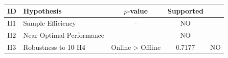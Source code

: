 \begin{tabular}{llcc}
\toprule
ID & Hypothesis & $p$-value & Supported \\
\midrule
H1 & Sample Efficiency & - & NO \\
H2 & Near-Optimal Performance & - & NO \\
H3 & Robustness to 10%
H4 & Online > Offline & 0.7177 & NO \\
\bottomrule
\end{tabular}